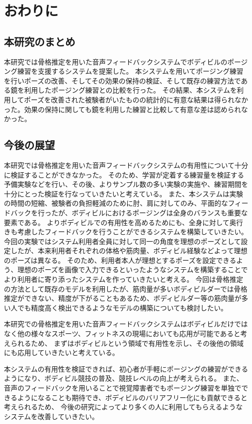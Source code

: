 \chapter{おわりに}
\label{conclusion}

\section{本研究のまとめ}
本研究では骨格推定を用いた音声フィードバックシステムでボディビルのポージング練習を支援するシステムを提案した。
本システムを用いてポージング練習を行いポーズの改善、そしてその効果の保持の検証、そして既存の練習方法である鏡を利用したポージング練習との比較を行った。
その結果、本システムを利用してポーズを改善された被験者がいたものの統計的に有意な結果は得られなかった。効果の保持に関しても鏡を利用した練習と比較して有意な差は認められなかった。

\section{今後の展望}

本研究では骨格推定を用いた音声フィードバックシステムの有用性について十分に検証することができなかった。
そのため、学習が定着する練習量を検証する予備実験などを行い、その後、よりサンプル数の多い実験の実施や、練習期間を十分にとった検証を行なっていきたいと考えている。
また、本システムは実験の時間の短縮、被験者の負担軽減のために肘、肩に対してのみ、平面的なフィードバックを行ったが、ボディビルにおけるポージングは全身のバランスも重要な要素である。
よりボディビルでの有用性を高めるためにも、全身に対して奥行きも考慮したフィードバックを行うことができるシステムを構築していきたい。
今回の実験ではシステム利用者全員に対して同一の角度を理想のポーズとして設定したが、本来利用者それぞれの体格や筋肉量、ボディビル経験などよって理想のポーズは異なる。
そのため、利用者本人が理想とするポーズを設定できるよう、理想のポーズを画像で入力できるといったようなシステムを構築することでより利用者に寄り添ったシステムを作っていきたいと考える。
今回は骨格推定の方法として既存のモデルを利用したが、筋肉量が多いボディビルダーでは骨格推定ができない、精度が下がることもあるため、ボディビルダー等の筋肉量が多い人でも精度高く検出できるようなモデルの構築についても検討したい。

本研究での骨格推定を用いた音声フィードバックシステムはボディビルだけではなく他の様々なスポーツ、フィットネスの現場においても応用が可能であると考えられるため、
まずはボディビルという領域で有用性を示し、その後他の領域にも応用していきたいと考えている。

本システムの有用性を検証できれば、初心者が手軽にポージングの練習ができるようになり、ボディビル競技の普及、競技レベルの向上が考えられる。
また、音声のフィードバックを用いることで視覚障害者でもポージング練習を単独でできるようになることも期待でき、ボディビルのバリアフリー化にも貢献できると考えられるため、
今後の研究によってより多くの人に利用してもらえるようなシステムを改善していきたい。

